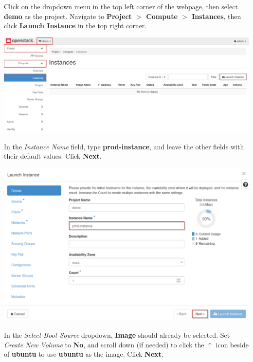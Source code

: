 \documentclass[letterpaper, 12pt]{article}
\begin{document}
\begin{enumerate}
    \begin{labstep}
        Click on the dropdown menu in the top left corner of the webpage, then select \textbf{demo} as the project.
        Navigate to \textbf{Project $>$ Compute $>$ Instances}, then click \textbf{Launch Instance} in the top right corner.

        \begin{center}
            \includegraphics[width=\linewidth]{images/part1/step5.png}
        \end{center}
    \end{labstep}

    \begin{labstep}
        In the \textit{Instance Name} field, type \textbf{prod-instance}, and leave the other fields with their default values.
        Click \textbf{Next}.

        \begin{center}
            \includegraphics[width=\linewidth]{images/part1/step6.png}
        \end{center}
    \end{labstep}

    \begin{labstep}
        In the \textit{Select Boot Source} dropdown, \textbf{Image} should already be selected.
        Set \textit{Create New Volume} to \textbf{No}, and scroll down (if needed) to click the $\uparrow$ icon beside of \textbf{ubuntu} to use \textbf{ubuntu} as the image.
        Click \textbf{Next}.


\end{labstep}
\end{enumerate}
\end{document}
